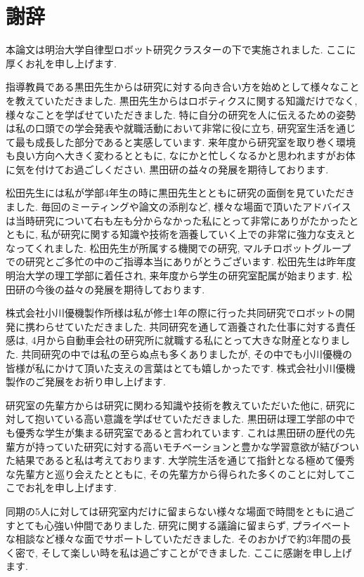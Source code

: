 \chapter*{謝辞}
本論文は明治大学自律型ロボット研究クラスターの下で実施されました. ここに厚くお礼を申し上げます. \par
指導教員である黒田先生からは研究に対する向き合い方を始めとして様々なことを教えていただきました. 黒田先生からはロボティクスに関する知識だけでなく, 様々なことを学ばせていただきました. 特に自分の研究を人に伝えるための姿勢は私の口頭での学会発表や就職活動において非常に役に立ち, 研究室生活を通じて最も成長した部分であると実感しています. 来年度から研究室を取り巻く環境も良い方向へ大きく変わるとともに, なにかと忙しくなるかと思われますがお体に気を付けてお過ごしください. 黒田研の益々の発展を期待しております. \par
松田先生には私が学部4年生の時に黒田先生とともに研究の面倒を見ていただきました. 毎回のミーティングや論文の添削など, 様々な場面で頂いたアドバイスは当時研究について右も左も分からなかった私にとって非常にありがたかったとともに, 私が研究に関する知識や技術を涵養していく上での非常に強力な支えとなってくれました. 松田先生が所属する機関での研究, マルチロボットグループでの研究とご多忙の中のご指導本当にありがとうございます. 松田先生は昨年度明治大学の理工学部に着任され, 来年度から学生の研究室配属が始まります. 松田研の今後の益々の発展を期待しております. \par
株式会社小川優機製作所様は私が修士1年の際に行った共同研究でロボットの開発に携わらせていただきました. 共同研究を通して涵養された仕事に対する責任感は, 4月から自動車会社の研究所に就職する私にとって大きな財産となりました. 共同研究の中では私の至らぬ点も多くありましたが, その中でも小川優機の皆様が私にかけて頂いた支えの言葉はとても嬉しかったです. 株式会社小川優機製作のご発展をお祈り申し上げます. \par
研究室の先輩方からは研究に関わる知識や技術を教えていただいた他に, 研究に対して抱いている高い意識を学ばせていただきました. 黒田研は理工学部の中でも優秀な学生が集まる研究室であると言われています. これは黒田研の歴代の先輩方が持っていた研究に対する高いモチベーションと豊かな学習意欲が結びついた結果であると私は考えております. 大学院生活を通じて指針となる極めて優秀な先輩方と巡り会えたとともに, その先輩方から得られた多くのことに対してここでお礼を申し上げます. \par
同期の5人に対しては研究室内だけに留まらない様々な場面で時間をともに過ごすとても心強い仲間でありました. 研究に関する議論に留まらず, プライベートな相談など様々な面でサポートしていただきました. そのおかげで約3年間の長く密で, そして楽しい時を私は過ごすことができました. ここに感謝を申し上げます. \par
